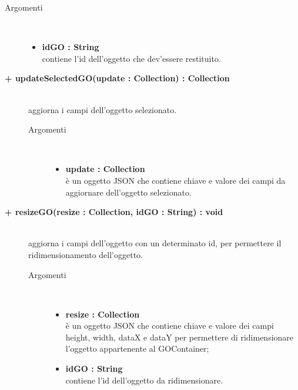 \begin{description}
\begin{description}
\begin{description}
			\item[Argomenti] \hfill \\
				\begin{itemize}
						\item \textbf{idGO : String			} \hfill \\
					contiene l'id dell'oggetto che dev'essere restituito.
				\end{itemize}

\end{description}

\end{description}

\begin{description}
		\item[\textbf{\color{blue}+ updateSelectedGO(update : Collection) : Collection			}] \hfill \\
			aggiorna i campi dell'oggetto selezionato.   

\begin{description}
			\item[Argomenti] \hfill \\
				\begin{itemize}
						\item \textbf{update : Collection			} \hfill \\
					è un oggetto JSON che contiene chiave e valore dei campi da aggiornare dell'oggetto selezionato.
				\end{itemize}

\end{description}

\end{description}

\begin{description}
		\item[\textbf{\color{blue}+ resizeGO(resize : Collection, idGO : String) : void			}] \hfill \\
			aggiorna i campi dell'oggetto con un determinato id, per permettere il ridimensionamento dell'oggetto.    

\begin{description}
			\item[Argomenti] \hfill \\
				\begin{itemize}
					\item \textbf{resize : Collection			} \hfill \\
					è un oggetto JSON che contiene chiave e valore dei campi height, width, dataX e dataY per permettere di ridimensionare l'oggetto appartenente al GOContainer;
					\item \textbf{idGO : String			} \hfill \\
					contiene l'id dell'oggetto da ridimensionare.
				\end{itemize}


\end{description}
\end{description}
\end{description}
